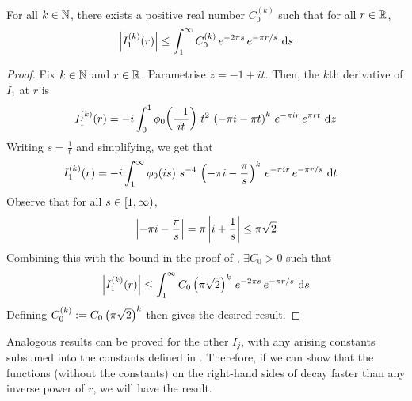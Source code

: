 \begin{boxlemma}\label{Ch4:Lemma:Reducing_higher_deriv_Schwartzness_I_1}
    For all $k \in \mathbb{N}$, there exists a positive real number $C_0^{(k)}$ such that for all $r \in \mathbb{R}$,
    \begin{align*}
        \left\lvert I_1^{(k)}\!\left( r \right) \right\rvert \leq \int_{1}^{\infty} C_0^{(k)} \, e^{-2\pi s} \, e^{- \pi r / s} \, \operatorname{d}\!{s}
    \end{align*}
\end{boxlemma}
\begin{proof}
    Fix $k \in \mathbb{N}$ and $r \in \mathbb{R}$. Parametrise $z = -1 + it$. Then, the $k$th derivative of $I_1$ at $r$ is
    \begin{align*}
        I_1^{(k)}\!\left( r \right) = -i \int_{0}^{1} \phi_0\!\left( \frac{-1}{it} \right) \, t^2 \, \left( -\pi i - \pi t \right)^k \, e^{-\pi i r} \, e^{\pi r t} \, \operatorname{d}\!{z}
    \end{align*}
    Writing $s = \frac{1}{t}$ and simplifying, we get that
    \begin{align*}
        I_1^{(k)}\!\left( r \right) &= -i \int_{1}^{\infty}
            \phi_0\!\left( is \right) \,
            s^{-4} \,
            \left( -\pi i - \frac{\pi}{s} \right)^k \,
            e^{-\pi i r} \,
            e^{-\pi r / s}\,
            \operatorname{d}\!{t}
    \end{align*}
    Observe that for all $s \in \left[1, \infty\right)$,
    \begin{align*}
        \left\lvert -\pi i - \frac{\pi}{s} \right\rvert = \pi \left\lvert i + \frac{1}{s} \right\rvert \leq \pi \sqrt{2}
    \end{align*}
    Combining this with the bound in the proof of , $\exists C_0 > 0$ such that
    \begin{align*}
        \left\lvert I_1^{(k)}\!\left( r \right) \right\rvert \leq \int_{1}^{\infty} C_0 \left( \pi \sqrt{2} \right)^{k} \, e^{-2\pi s} \, e^{- \pi r / s} \, \operatorname{d}\!{s}
    \end{align*}
    Defining $C_0^{(k)} := C_0 \left( \pi \sqrt{2} \right)^{k}$ then gives the desired result.
\end{proof}

Analogous results can be proved for the other $I_j$, with any arising constants subsumed into the constants defined in . Therefore, if we can show that the functions (without the constants) on the right-hand sides of  decay faster than any inverse power of $r$, we will have the result.


